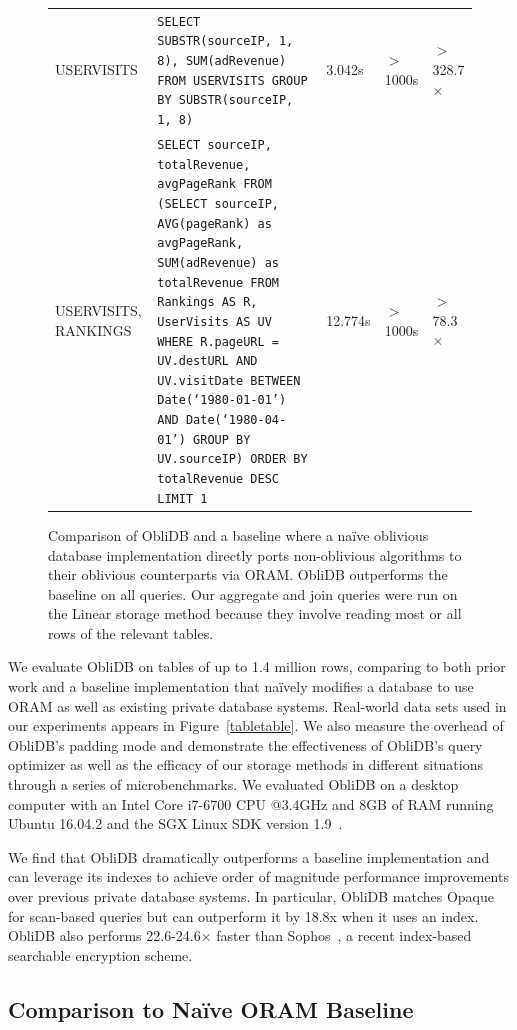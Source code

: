 \documentclass[letterpaper,twocolumn,10pt]{article}
\def\name/{ObliDB}
\begin{document}
\begin{figure}
\begin{tabularx}{\textwidth}{p{1.9cm} X l l l}
USERVISITS & \footnotesize\texttt{SELECT SUBSTR(sourceIP, 1, 8), SUM(adRevenue) FROM USERVISITS GROUP BY SUBSTR(sourceIP, 1, 8)}& 3.042s &$>$1000s & $>$328.7$\times$\\\rule{0pt}{2ex}
USERVISITS, RANKINGS & \footnotesize\texttt{SELECT sourceIP, totalRevenue, avgPageRank
FROM
  (SELECT sourceIP,
          AVG(pageRank) as avgPageRank,
          SUM(adRevenue) as totalRevenue
    FROM Rankings AS R, UserVisits AS UV
    WHERE R.pageURL = UV.destURL
       AND UV.visitDate BETWEEN Date(`1980-01-01') AND Date(`1980-04-01')
    GROUP BY UV.sourceIP)
  ORDER BY totalRevenue DESC LIMIT 1} & 12.774s & $>$1000s& $>$78.3$\times$\\
\end{tabularx}
\caption{\small Comparison of \name/ and a baseline where a na\"ive oblivious database implementation directly ports non-oblivious algorithms to their oblivious counterparts via ORAM. \name/ outperforms the baseline on all queries. Our aggregate and join queries were run on the Linear storage method because they involve reading most or all rows of the relevant tables.}
\label{figQueries}
\end{figure}
We evaluate \name/ on tables of up to 1.4 million rows, comparing to both prior work and a baseline implementation that na\"ively modifies a database to use ORAM as well as existing private database systems. Real-world data sets used in our experiments appears in Figure~\ref{tabletable}. We also measure the overhead of \name/'s padding mode and  demonstrate the effectiveness of \name/'s query optimizer as well as the efficacy of our storage methods in different situations through a series of microbenchmarks. We evaluated \name/ on a desktop computer with an Intel Core i7-6700 CPU @3.4GHz and 8GB of RAM running Ubuntu 16.04.2 and the SGX Linux SDK version 1.9~\cite{SGXRef}.

We find that \name/ dramatically outperforms a baseline implementation and can leverage its indexes to achieve order of magnitude performance improvements over previous private database systems. In particular, \name/ matches Opaque~\cite{ZDB+17} for scan-based queries but can outperform it by 18.8x when it uses an index. \name/ also performs 22.6-24.6$\times$ faster than Sophos~\cite{Bost16}, a recent index-based searchable encryption scheme.

\subsection{Comparison to Na\"ive ORAM Baseline}
\end{document}

